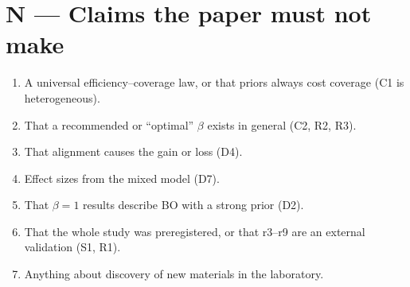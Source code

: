 \documentclass[10pt,a4paper]{article}
\begin{document}
\section*{N --- Claims the paper must not make}
\begin{enumerate}[label=\textbf{N\arabic*},leftmargin=*]
\item A universal efficiency--coverage law, or that priors always cost coverage (C1 is heterogeneous).
\item That a recommended or ``optimal'' $\beta$ exists in general (C2, R2, R3).
\item That alignment causes the gain or loss (D4).
\item Effect sizes from the mixed model (D7).
\item That $\beta=1$ results describe BO with a strong prior (D2).
\item That the whole study was preregistered, or that r3--r9 are an external validation (S1, R1).
\item Anything about discovery of new materials in the laboratory.
\end{enumerate}
\end{document}
